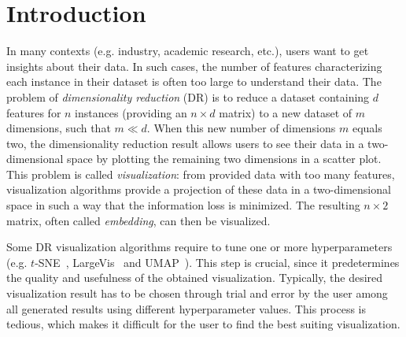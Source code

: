 \section{Introduction}


In many contexts (e.g. industry, academic research, etc.), users want to get insights about their data. In such cases, the number of features characterizing each instance in their dataset is often too large to understand their data. The problem of {\it dimensionality reduction} (DR) is to reduce a dataset containing $d$ features for $n$ instances (providing an $n \times d$ matrix) to a new dataset of $m$ dimensions, such that $m \ll d$. When this new number of dimensions $m$ equals two, the dimensionality reduction result allows users to see their data in a two-dimensional space by plotting the remaining two dimensions in a scatter plot. This problem is called {\it visualization}: from provided data with too many features, visualization algorithms provide a projection of these data in a two-dimensional space in such a way that the information loss is minimized. The resulting $n \times 2$ matrix, often called {\it embedding}, can then be visualized.


Some DR visualization algorithms require to tune one or more hyperparameters (e.g. $t$-SNE~\cite{maaten2008tsne}, LargeVis~\cite{tang2016visualizing} and UMAP~\cite{mcinnes2018umap}). This step is crucial, since it predetermines the quality and usefulness of the obtained visualization. Typically, the desired visualization result has to be chosen through trial and error by the user among all generated results using different hyperparameter values. This process is tedious, which makes it difficult for the user to find the best suiting visualization.

